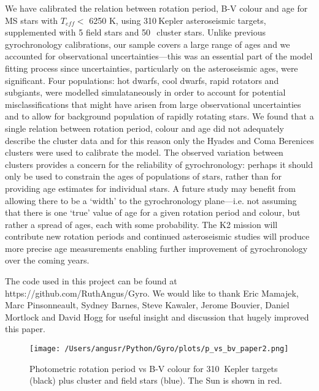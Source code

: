 \documentclass[10pt,preprint]{aastex}
\newcommand{\teff}{$T_{eff}$}
\newcommand{\nastero}{310}
\newcommand{\nHC}{50~}
\begin{document}
We have calibrated the relation between rotation period, B-V colour and age for MS stars with \teff $<$ 6250 K, using \nastero$~$Kepler asteroseismic targets, supplemented with 5 field stars and \nHC$~$cluster stars.
Unlike previous gyrochronology calibrations, our sample covers a large range of ages and we accounted for observational uncertainties---this was an essential part of the model fitting process since uncertainties, particularly on the asteroseismic ages, were significant.
Four populations: hot dwarfs, cool dwarfs, rapid rotators and subgiants, were modelled simulataneously in order to account for potential misclassifications that might have arisen from large observational uncertainties and to allow for background population of rapidly rotating stars.
We found that a single relation between rotation period, colour and age did not adequately describe the cluster data and for this reason only the Hyades and Coma Berenices clusters were used to calibrate the model.
The observed variation between clusters provides a concern for the reliability of gyrochronology: perhaps it should only be used to constrain the ages of populations of stars, rather than for providing age estimates for individual stars.
A future study may benefit from allowing there to be a `width' to the gyrochronology plane---i.e. not assuming that there is one `true' value of age for a given rotation period and colour, but rather a spread of ages, each with some probability.
The K2 mission will contribute new rotation periods and continued asteroseismic studies will produce more precise age measurements enabling further improvement of gyrochronology over the coming years.

The code used in this project can be found at https://github.com/RuthAngus/Gyro.
We would like to thank Eric Mamajek, Marc Pinsonneault, Sydney Barnes, Steve Kawaler, Jerome Bouvier, Daniel Mortlock and David Hogg for useful insight and discussion that hugely improved this paper.




\begin{figure}[ht]
\begin{center}
\texttt{[image: /Users/angusr/Python/Gyro/plots/p\_vs\_bv\_paper2.png]}
\caption{Photometric rotation period vs B-V colour for \nastero$~$ Kepler targets (black) plus cluster and field stars (blue). The Sun is shown in red.}
\label{fig:3d}
\end{center}
\end{figure}
\end{document}
